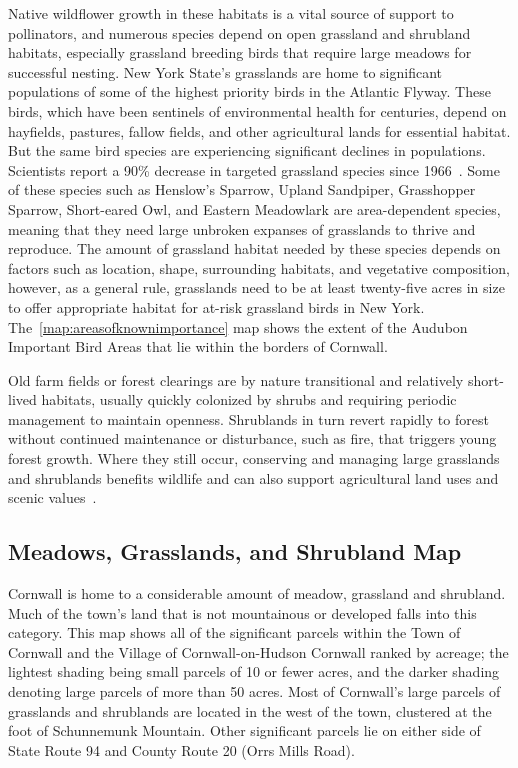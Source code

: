 Native wildflower growth in these habitats is a vital source of support to
pollinators, and numerous species depend on open grassland and shrubland
habitats, especially grassland breeding birds that require large meadows for
successful nesting. New York State's grasslands are home to significant
populations of some of the highest priority birds in the Atlantic Flyway. These
birds, which have been sentinels of environmental health for centuries, depend
on hayfields, pastures, fallow fields, and other agricultural lands for
essential habitat. But the same bird species are experiencing significant
declines in populations. Scientists report a 90\% decrease in targeted
grassland species since 1966~\citep{audoboniba}. Some of these species such as Henslow's
Sparrow, Upland Sandpiper, Grasshopper Sparrow, Short-eared Owl, and Eastern
Meadowlark are area-dependent species, meaning that they need large unbroken
expanses of grasslands to thrive and reproduce. The amount of grassland habitat
needed by these species depends on factors such as location, shape, surrounding
habitats, and vegetative composition, however, as a general rule, grasslands
need to be at least twenty-five acres in size to offer appropriate habitat for
at-risk grassland birds in New York. The~\ref{map:areasofknownimportance}
map shows the extent of the Audubon Important Bird Areas that lie within the
borders of Cornwall.

Old farm fields or forest clearings are by nature transitional and relatively
short-lived habitats, usually quickly colonized by shrubs and requiring
periodic management to maintain openness. Shrublands in turn revert rapidly to
forest without continued maintenance or disturbance, such as fire, that
triggers young forest growth. Where they still occur, conserving and managing
large grasslands and shrublands benefits wildlife and can also support
agricultural land uses and scenic values~\citep{haeckel2014}.
\subsection*{Meadows, Grasslands, and Shrubland Map}
Cornwall is home to a considerable amount of meadow, grassland and shrubland.
Much of the town’s land that is not mountainous or developed falls into this
category. This map shows all of the significant parcels within the Town of
Cornwall and the Village of Cornwall-on-Hudson Cornwall ranked by acreage; the
lightest shading being small parcels of 10 or fewer acres, and the darker
shading denoting large parcels of more than 50 acres. Most of Cornwall's large
parcels of grasslands and shrublands are located in the west of the town,
clustered at the foot of Schunnemunk Mountain. Other significant parcels lie on
either side of State Route 94 and County Route 20 (Orrs Mills Road).

